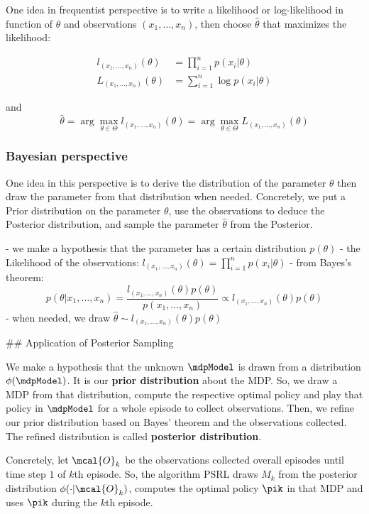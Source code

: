 One idea in frequentist perspective is to write a likelihood or log-likelihood in function of $\theta$ and observations $(x_1,\dots,x_n)$, then choose $\hat{\theta}$ that maximizes the likelihood:

\begin{align*}
l_{(x_1,\dots,x_n)}(\theta)&=\prod_{i=1}^{n}p(x_i|\theta) \\
L_{(x_1,\dots,x_n)}(\theta)&=\sum_{i=1}^{n}\log p(x_i|\theta)
\end{align*}

and $$\hat{\theta}=\arg\max_{\theta\in\Theta}l_{(x_1,\dots,x_n)}(\theta)=\arg\max_{\theta\in\Theta}L_{(x_1,\dots,x_n)}(\theta)$$

\subsubsection{Bayesian perspective}
\label{subsubsec:bayes_perspective}

One idea in this perspective is to derive the distribution of the parameter $\theta$ then draw the parameter from that distribution when needed. Concretely, we put a Prior distribution on the parameter $\theta$, use the observations to deduce the Posterior distribution, and sample the parameter $\hat{\theta}$ from the Posterior.

- we make a hypothesis that the parameter has a certain distribution $p(\theta)$
- the Likelihood of the observations: $l_{(x_1,\dots,x_n)}(\theta)=\prod_{i=1}^{n}p(x_i|\theta)$
- from Bayes's theorem: $$p(\theta|x_1,\dots,x_n) =\frac{l_{(x_1,\dots,x_n)}(\theta)p(\theta)}{p(x_1,\dots,x_n)} \propto l_{(x_1,\dots,x_n)}(\theta)p(\theta)$$
- when needed, we draw $\hat{\theta}\sim l_{(x_1,\dots,x_n)}(\theta)p(\theta)$

## Application of Posterior Sampling

We make a hypothesis that the unknown $\mdpModel$ is drawn from a distribution $\phi(\mdpModel)$. It is our \textbf{prior distribution} about the MDP. So, we draw a MDP from that distribution, compute the respective optimal policy and play that policy in $\mdpModel$ for a whole episode to collect observations. Then, we refine our prior distribution based on Bayes' theorem and the observations collected. The refined distribution is called \textbf{posterior distribution}.

Concretely, let $\mcal{O}_k$ be the observations collected overall episodes until time step $1$ of $k$th episode. So, the algorithm $\mathrm{PSRL}$ draws $M_k$ from the posterior distribution $\phi(\cdot|\mcal{O}_k)$, computes the optimal policy $\pik$ in that MDP and uses $\pik$ during the $k$th episode.

